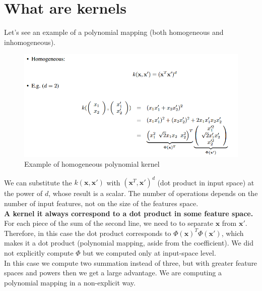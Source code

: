 \section{What are kernels}
    Let's see an example of a polynomial mapping (both homogeneous and inhomogeneous). 
    \begin{figure} [ht]
        \centering
        \includegraphics[scale=0.5]{images/homo_poly.png}
        \caption{Example of homogeneous polynomial kernel}
        \label{fig:homo_poly_kernel}
    \end{figure}
    We can substitute the $k(\pmb{x}, \pmb{x}')$ with $(\pmb{x}^T, \pmb{x}')^d$ (dot product in input space) at the power of $d$, whose result is a scalar. The number of operations depends on the number of input features, not on the size of the features space.\\
    \textbf{A kernel it always correspond to a dot product in some feature space.}
    For each piece of the sum of the second line, we need to to separate $\pmb{x}$ from $\pmb{x}'$. 
    Therefore, in this case the dot product corresponds to $\Phi(\pmb{x})^T \Phi(\pmb{x}')$, which makes it a dot product (polynomial mapping, aside from the coefficient). 
    We did not explicitly compute $\Phi$ but we computed only at input-space level.\\
    In this case we compute two summation instead of three, but with greater feature spaces and powers then we get a large advantage.
    We are computing a polynomial mapping in a non-explicit way.\\

